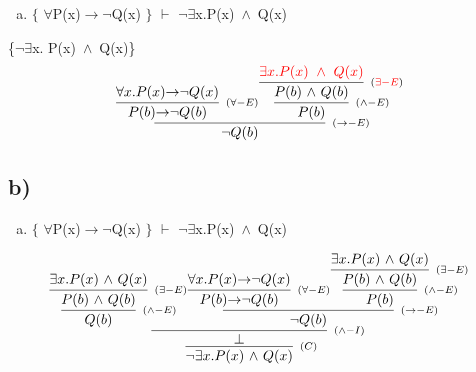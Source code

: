 \documentclass[aspectratio=43]{beamer}
\newcommand{\ria}{$\rightarrow$}
\newcommand{\fall}{$\forall$}
\newcommand{\ex}{$\exists$}
\newcommand{\nao}{$\neg$}
\newcommand{\nex}{\nao\ex}
\newcommand{\andd}{$\wedge$}
\begin{document}
    \begin{frame}[fragile]
    	
    	\begin{enumerate}[b)]
			
			\item $\{$ \fall P(x)\ria \nao Q(x) $\}$ $\vdash$ \nex  x.P(x)\ \andd\ Q(x) \\ 
			
		\end{enumerate}
        \{\nex  x. P(x)\ \andd\ Q(x)\}
        \vspace{90pt}
        \[
        \begin{array}{c}
		
        	\infer[_{(\to-E)}]
            {$\nao$ Q(b)}
            {\infer[_{(\forall-E)}] 
            	{P(b) $\ria$ $\nao$ Q(b)}
               	{$\fall$x.P(x)$\ria$ $\nao$ Q(x)} 
            \infer[_{(\land-E)}] 
                {P(b)} 
                {\infer[_{(\textcolor{red}{\exists-E})}] 
                        	{P(b)\ $\andd$\ Q(b)}
                        	{\textcolor{red}{\exists x.P(x)\ \wedge\ Q(x)}}
                }
            }
		\end{array}
        \]
        
	\end{frame}
    
    \subsection{b)}
        
	\begin{frame}[fragile]
    
    	\begin{enumerate}[b)]
			
			\item $\{$ \fall P(x)\ria \nao Q(x) $\}$ $\vdash$ \nex  x.P(x)\ \andd\ Q(x) \\ 
			
		\end{enumerate}
        \vspace{50pt}
		\[
        \begin{array}{c}
		\infer[_{(C)}]
			{$\nex$ x.P(x)\ $\andd$\ Q(x)}
			{\infer[_{(\land-I)}] 
            	{\bot}
                {\infer[_{(\land-E)}] 
                	{Q(b)}
                    {\infer[_{(\exists-E)}]
                    	{P(b)\ $\andd$\ Q(b)}
                        {$\ex$x.P(x)\ $\andd$\ Q(x)}
                    }
                \infer[_{(\to-E)}] 
                	{$\nao$ Q(b)}
                	{\infer[_{(\forall-E)}] 
                    	{P(b) $\ria$ $\nao$ Q(b)}
                    	{$\fall$x.P(x)$\ria$ $\nao$ Q(x)}
                    \infer[_{(\land-E)}] 
                    	{P(b)}
                        {\infer[_{(\exists-E)}] 
                        	{P(b)\ $\andd$\ Q(b)}
                        	{$\ex$x.P(x)\ $\andd$\ Q(x)}
                        }
                    }
                }
            }
		\end{array}
        \]
		
	\end{frame}
	
\end{document}
